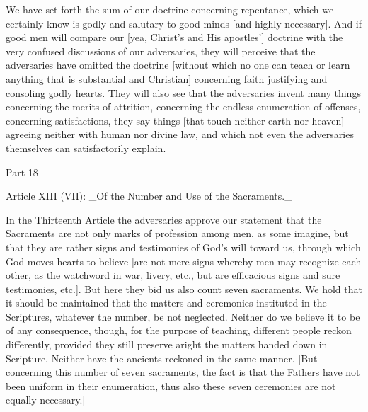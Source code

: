 We have set forth the sum of our doctrine concerning repentance,
which we certainly know is godly and salutary to good minds [and
highly necessary].  And if good men will compare our [yea, Christ's
and His apostles'] doctrine with the very confused discussions of our
adversaries, they will perceive that the adversaries have omitted the
doctrine [without which no one can teach or learn anything that is
substantial and Christian] concerning faith justifying and consoling
godly hearts.  They will also see that the adversaries invent many
things concerning the merits of attrition, concerning the endless
enumeration of offenses, concerning satisfactions, they say things
[that touch neither earth nor heaven] agreeing neither with human nor
divine law, and which not even the adversaries themselves can
satisfactorily explain.




Part 18


Article XIII (VII): _Of the Number and Use of the Sacraments._

In the Thirteenth Article the adversaries approve our statement that
the Sacraments are not only marks of profession among men, as some
imagine, but that they are rather signs and testimonies of God's will
toward us, through which God moves hearts to believe [are not mere
signs whereby men may recognize each other, as the watchword in war,
livery, etc., but are efficacious signs and sure testimonies, etc.].
But here they bid us also count seven sacraments.  We hold that it
should be maintained that the matters and ceremonies instituted in
the Scriptures, whatever the number, be not neglected.  Neither do we
believe it to be of any consequence, though, for the purpose of
teaching, different people reckon differently, provided they still
preserve aright the matters handed down in Scripture.  Neither have
the ancients reckoned in the same manner.  [But concerning this
number of seven sacraments, the fact is that the Fathers have not
been uniform in their enumeration, thus also these seven ceremonies
are not equally necessary.]

